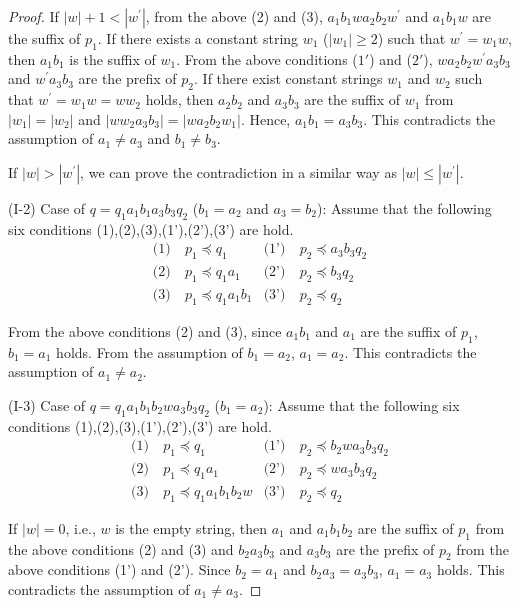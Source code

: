 \begin{proof}
If $|w|+1 < |w^{\prime}|$, from the above (2) and (3), 
$a_{1}b_{1}wa_{2}b_{2}w^{\prime}$ and $a_{1}b_{1}w$ are the suffix of $p_{1}$.
If there exists a constant string $w_{1}$ ($|w_{1}|\geq 2$) such that $w^{\prime}=w_{1}w$, then $a_{1}b_{1}$ is the suffix of $w_{1}$.
From  the above conditions ($1'$) and ($2'$), 
$wa_{2}b_{2}w^{\prime}a_{3}b_{3}$ and $w^{\prime}a_{3}b_{3}$ are the prefix of $p_{2}$.
If there exist constant strings $w_{1}$ and $w_{2}$ such that $w^{\prime} = w_{1}w=ww_{2}$ holds, then $a_{2}b_{2}$ and $a_{3}b_{3}$ are the suffix of $w_{1}$ from $|w_1|=|w_2|$ and $|ww_{2}a_{3}b_{3}|=|wa_{2}b_{2}w_{1}|$.
Hence, $a_{1}b_{1}=a_{3}b_{3}$.
This contradicts the assumption of $a_{1} \ne a_{3}$ and $b_{1} \ne b_{3}$.

If $|w|>|w^{\prime}|$, we can prove the contradiction in a similar way as $|w|\le|w^{\prime}|$.

\smallskip

\noindent
(I-2) Case of $q=q_{1}a_{1}b_{1}a_{3}b_{3}q_{2}$ ($b_{1}=a_{2}$ and $a_{3}=b_{2}$):
Assume that the following six conditions (1),(2),(3),(1'),(2'),(3') are hold.
\begin{align*}
\textrm{(1)}~& p_{1} \preceq q_{1} & \textrm{(1')}~& p_{2} \preceq a_{3}b_{3}q_{2} \\
\textrm{(2)}~& p_{1} \preceq q_{1}a_{1} & \textrm{(2')}~& p_{2} \preceq b_{3}q_{2} \\
\textrm{(3)}~& p_{1} \preceq q_{1}a_{1}b_{1} & \textrm{(3')}~& p_{2} \preceq q_{2}
\end{align*}

\noindent
From the above conditions (2) and (3), since $a_{1}b_{1}$ and $a_{1}$ are the suffix of $p_{1}$, 
$b_{1} = a_{1}$ holds.
From the assumption of $b_{1}=a_{2}$, $a_{1}=a_{2}$.
This contradicts the assumption of $a_{1}\not= a_{2}$.
\smallskip

\noindent
(I-3) Case of $q=q_{1}a_{1}b_{1}b_{2}wa_{3}b_{3}q_{2}$ ($b_{1}=a_{2}$):
Assume that the following six conditions (1),(2),(3),(1'),(2'),(3') are hold.
\begin{align*}
\textrm{(1)}~& p_{1} \preceq q_{1} & \textrm{(1')}~& p_{2} \preceq b_{2}wa_{3}b_{3}q_{2} \\
\textrm{(2)}~& p_{1} \preceq q_{1}a_{1} & \textrm{(2')}~& p_{2} \preceq wa_{3}b_{3}q_{2} \\
\textrm{(3)}~& p_{1} \preceq q_{1}a_{1}b_{1}b_{2}w & \textrm{(3')}~& p_{2} \preceq q_{2}
\end{align*}

If $|w|=0$, i.e., $w$ is the empty string, then $a_{1}$ and $a_{1}b_{1}b_{2}$ are the suffix of $p_{1}$ from the above conditions (2) and (3)
and $b_{2}a_{3}b_{3}$ and $a_{3}b_{3}$ are the prefix of $p_{2}$ from the above conditions (1') and (2').
Since $b_{2}=a_{1}$ and $b_{2}a_{3}=a_{3}b_{3}$, $a_{1}=a_{3}$ holds.
This contradicts the assumption of $a_{1}\not= a_{3}$.


\end{proof}

